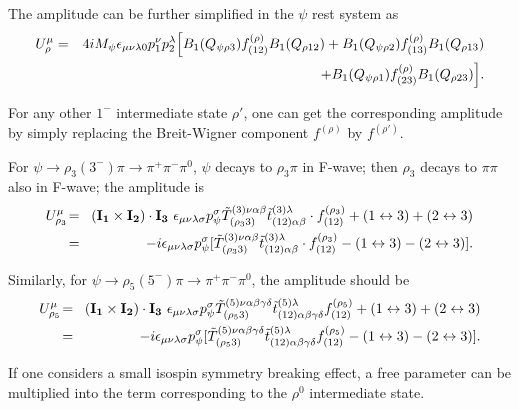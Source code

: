 The amplitude can be further simplified in the $\psi$ rest system
as
\begin{eqnarray}
U_\rho^\mu &=& 4iM_\psi\epsilon_{\mu\nu\lambda 0}p_1^\nu
p_2^\lambda \Bigl[B_1(Q_{\psi\rho 3}) f^{(\rho)}_{(12)}B_1(Q_{\rho
12}) +
B_1(Q_{\psi\rho 2}) f^{(\rho)}_{(13)} B_1(Q_{\rho 13}) \nonumber\\
& &\quad\quad\quad + B_1(Q_{\psi\rho 1}) f^{(\rho)}_{(23)}
B_1(Q_{\rho 23})\Bigr].
\end{eqnarray}

For any other $1^-$ intermediate state $\rho'$, one can get the
corresponding amplitude by simply replacing the Breit-Wigner
component $f^{(\rho)}$  by $f^{(\rho')}$.

For $\psi\to\rho_3(3^-)\pi\to\pi^+\pi^-\pi^0$, $\psi$ decays to
$\rho_3\pi$ in F-wave; then $\rho_3$ decays to $\pi\pi$ also in
F-wave; the amplitude is
\begin{eqnarray} U_{\rho_3}^\mu \!&=&\! {\bf (I_1\times I_2)\cdot
I_3} ~\epsilon_{\mu\nu\lambda\sigma}p_\psi^\sigma \tilde
T^{(3)\nu\alpha\beta}_{(\rho_3 3)}\tilde
t^{(3)\lambda}_{(12)\alpha\beta}\cdot f^{(\rho_3)}_{(12)} +
(1\leftrightarrow 3) +
(2\leftrightarrow 3) \nonumber\\
&=&\! -i\epsilon_{\mu\nu\lambda\sigma}p_\psi^\sigma [\tilde
T^{(3)\nu\alpha\beta}_{(\rho_3 3)}\tilde
t^{(3)\lambda}_{(12)\alpha\beta}\cdot f^{(\rho_3)}_{(12)} -
(1\leftrightarrow 3) - (2\leftrightarrow 3)].
\end{eqnarray}

Similarly, for $\psi\to\rho_5(5^-)\pi\to\pi^+\pi^-\pi^0$, the
amplitude should be
\begin{eqnarray}
U_{\rho_5}^\mu \!&=&\! {\bf (I_1\times I_2)\cdot I_3}
~\epsilon_{\mu\nu\lambda\sigma}p_\psi^\sigma \tilde
T^{(5)\nu\alpha\beta\gamma\delta}_{(\rho_53)} \tilde
t^{(5)\lambda}_{(12)\alpha\beta\gamma\delta}f^{(\rho_5)}_{(12)} +
(1\leftrightarrow 3) +
(2\leftrightarrow 3) \nonumber\\
&=&\! -i\epsilon_{\mu\nu\lambda\sigma}p_\psi^\sigma [\tilde
T^{(5)\nu\alpha\beta\gamma\delta}_{(\rho_53)} \tilde
t^{(5)\lambda}_{(12)\alpha\beta\gamma\delta}f^{(\rho_5)}_{(12)} -
(1\leftrightarrow 3) - (2\leftrightarrow 3)].
\end{eqnarray}

If one considers a small isospin symmetry breaking effect, a free
parameter can be multiplied into the term corresponding to the
$\rho^0$ intermediate state.

